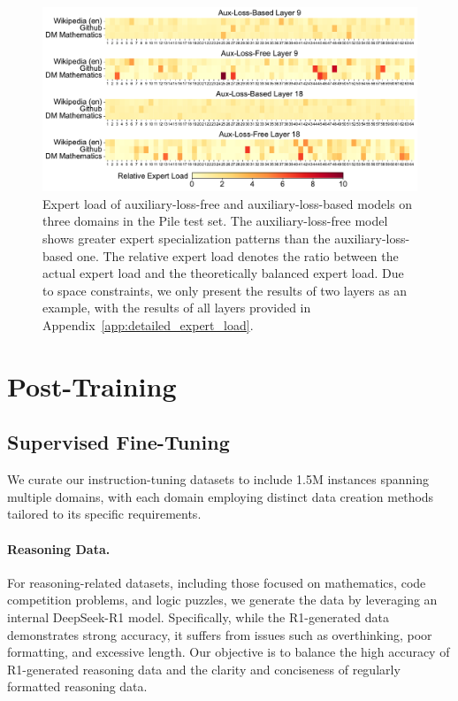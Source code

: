 \documentclass[11pt, a4paper, logo, copyright, nonumbering]{deepseek}
\begin{document}
\begin{CJK*}{UTF8}{gbsn}
\begin{figure}[!t]
\centering
\includegraphics[width=0.99\linewidth]{figures/relative_expert_load_multi.pdf}
\caption{
    Expert load of auxiliary-loss-free and auxiliary-loss-based models on three domains in the Pile test set. 
    The auxiliary-loss-free model shows greater expert specialization patterns than the auxiliary-loss-based one.
    The relative expert load denotes the ratio between the actual expert load and the theoretically balanced expert load. 
    Due to space constraints, we only present the results of two layers as an example, with the results of all layers provided in Appendix~\ref{app:detailed_expert_load}.
}
\label{fig:expert_load}
\end{figure}

\section{Post-Training}
\label{sec:alignment}

\subsection{Supervised Fine-Tuning}

We curate our instruction-tuning datasets to include 1.5M instances spanning multiple domains, with each domain employing distinct data creation methods tailored to its specific requirements.

\paragraph{Reasoning Data.} 
For reasoning-related datasets, including those focused on mathematics, code competition problems, and logic puzzles, we generate the data by leveraging an internal DeepSeek-R1 model. 
Specifically, while the R1-generated data demonstrates strong accuracy, it suffers from issues such as overthinking, poor formatting, and excessive length. 
Our objective is to balance the high accuracy of R1-generated reasoning data and the clarity and conciseness of regularly formatted reasoning data.


\end{CJK*}
\end{document}

